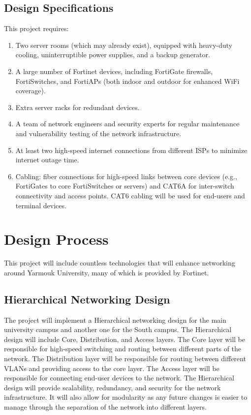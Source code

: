 \documentclass[12pt]{report}
\begin{document}
\subsection{Design Specifications}
This project requires:
\begin{enumerate}
    \item Two server rooms (which may already exist), equipped with heavy-duty cooling, uninterruptible power supplies, and a backup generator.
    \item A large number of Fortinet devices, including FortiGate firewalls, FortiSwitches, and FortiAPs (both indoor and outdoor for enhanced WiFi coverage).
    \item Extra server racks for redundant devices.
    \item A team of network engineers and security experts for regular maintenance and vulnerability testing of the network infrastructure.
    \item At least two high-speed internet connections from different ISPs to minimize internet outage time.
    \item Cabling: fiber connections for high-speed links between core devices (e.g., FortiGates to core FortiSwitches or servers) and CAT6A for inter-switch connectivity and access points. CAT6 cabling will be used for end-users and terminal devices.
\end{enumerate}
\newpage
\section{Design Process}
This project will include countless technologies that will enhance networking around Yarmouk University, many of which is provided by Fortinet.
\subsection{Hierarchical Networking Design}
The project will implement a Hierarchical networking design for the main university campus and another one for the South campus. The Hierarchical design will include Core, Distribution, and Access layers. The Core layer will be responsible for high-speed switching and routing between different parts of the network. The Distribution layer will be responsible for routing between different VLANs and providing access to the core layer. The Access layer will be responsible for connecting end-user devices to the network. The Hierarchical design will provide scalability, redundancy, and security for the network infrastructure. It will also allow for modularity as any future changes is easier to manage through the separation of the network into different layers.\cite{HeirNWDes}
\end{document}
